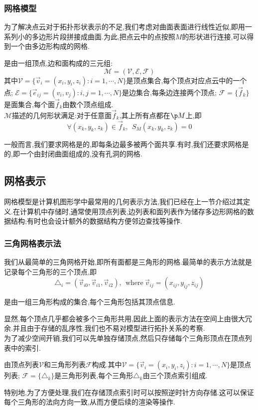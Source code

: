 \documentclass{ctexart}
\begin{document}
\subsubsection{网格模型}
为了解决点云对于拓扑形状表示的不足,我们考虑对曲面表面进行线性近似,即用一系列小的多边形片段拼接成曲面.为此,把点云中的点按照$M$的形状进行连接,可以得到一个由多边形构成的网格.
\begin{definition}[网格模型]
    是由一组顶点,边和面构成的三元组:
    \[\mathcal{M}=(\mathcal{V},\mathcal{E},\mathcal{F})\]
    其中$\mathcal{V}=\{\vec{v}_i=(x_i,y_i,z_i):i=1,\cdots,N\}$是顶点集合,每个顶点对应点云中的一个点; $\mathcal{E}=\{\vec{e}_{ij}=(v_i,v_j):i,j=1,\cdots,N\}$是边集合,每条边连接两个顶点; $\mathcal{F}=\{\vec{f}_k\}$是面集合,每个面$\vec{f}_k$由数个顶点组成.\\
    $\mathcal{M}$描述的几何形状满足:对于任意面$\vec{f}_k$,其上所有点都在$\p M$上,即
    \[\forall\left(x_k,y_k,z_k\right)\in\vec{f}_k,\ \ S_M\left(x_k,y_k,z_k\right)=0\]
\end{definition}
一般而言,我们要求网格是的,即每条边最多被两个面共享.有时,我们还要求网格是的,即一个由封闭曲面组成的,没有孔洞的网格.
\subsection{网格表示}
网格模型是计算机图形学中最常用的几何表示方法,我们已经在上一节介绍过其定义.在计算机中存储时,通常使用顶点列表,边列表和面列表作为储存多边形网格的数据结构;有时也会设计额外的数据结构方便邻边查找等操作.
\subsubsection{三角网格表示法}
我们从最简单的三角网格开始,即所有面都是三角形的网格.最简单的表示方法就是记录每个三角形的三个顶点,即\[\triangle_i=\left(\vec{v}_{i0},\vec{v}_{i1},\vec{v}_{i2}\right),\ \ \text{where}\ \vec{v}_{ij}=\left(x_{ij},y_{ij},z_{ij}\right)\]
\begin{definition}[三角形乱序集合]
    是由一组三角形构成的集合,每个三角形包括其顶点信息.
\end{definition}
显然,每个顶点几乎都会被多个三角形共用,因此上面的表示方法在空间上由很大冗余.并且由于存储的乱序性,我们也不易对模型进行拓扑关系的考察.\\
\indent 为了减少空间开销,我们可以先单独存储顶点,然后只存储每个三角形顶点在顶点列表中的索引.
\begin{definition}[索引三角形网格]
    由顶点列表$\mathcal{V}$和三角形列表$\mathcal{F}$构成.其中$\mathcal{V}=\{\vec{v}_i=(x_i,y_i,z_i):i=1,\cdots,N\}$是顶点列表; $\mathcal{F}=\{\triangle_k\}$是三角形列表,每个三角形$\triangle_k$由三个顶点索引组成.
\end{definition}
特别地,为了方便处理,我们在存储顶点索引时可以按照逆时针方向存储.这可以保证每个三角形的法向方向一致,从而方便后续的渲染等操作.
\end{document}
